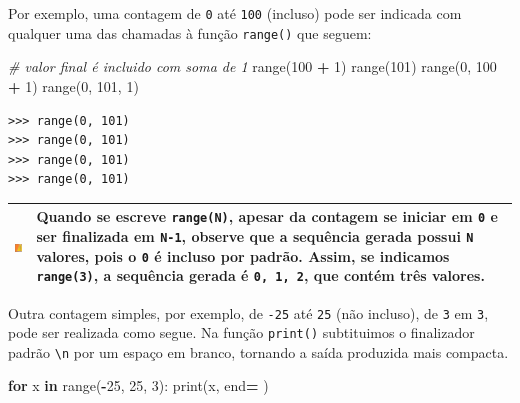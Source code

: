 \documentclass[
]{book}
\newenvironment{Shaded}{\begin{snugshade}}{\end{snugshade}}
\newcommand{\BuiltInTok}[1]{#1}
\newcommand{\CommentTok}[1]{\textcolor[rgb]{0.56,0.35,0.01}{\textit{#1}}}
\newcommand{\ControlFlowTok}[1]{\textcolor[rgb]{0.13,0.29,0.53}{\textbf{#1}}}
\newcommand{\DecValTok}[1]{\textcolor[rgb]{0.00,0.00,0.81}{#1}}
\newcommand{\KeywordTok}[1]{\textcolor[rgb]{0.13,0.29,0.53}{\textbf{#1}}}
\newcommand{\NormalTok}[1]{#1}
\newcommand{\OperatorTok}[1]{\textcolor[rgb]{0.81,0.36,0.00}{\textbf{#1}}}
\newcommand{\StringTok}[1]{\textcolor[rgb]{0.31,0.60,0.02}{#1}}
\begin{document}
Por exemplo, uma contagem de \texttt{0} até \texttt{100} (incluso) pode ser indicada com qualquer uma das chamadas à função \texttt{range()} que seguem:

\begin{Shaded}
\begin{Highlighting}[]
\CommentTok{\# valor final é incluido com soma de 1}
\BuiltInTok{range}\NormalTok{(}\DecValTok{100} \OperatorTok{+} \DecValTok{1}\NormalTok{)}
\BuiltInTok{range}\NormalTok{(}\DecValTok{101}\NormalTok{)}
\BuiltInTok{range}\NormalTok{(}\DecValTok{0}\NormalTok{, }\DecValTok{100} \OperatorTok{+} \DecValTok{1}\NormalTok{)}
\BuiltInTok{range}\NormalTok{(}\DecValTok{0}\NormalTok{, }\DecValTok{101}\NormalTok{, }\DecValTok{1}\NormalTok{)}
\end{Highlighting}
\end{Shaded}

\begin{verbatim}
>>> range(0, 101)
>>> range(0, 101)
>>> range(0, 101)
>>> range(0, 101)
\end{verbatim}

\begin{longtable}[]{@{}
  >{\centering\arraybackslash}p{}
  >{\raggedright\arraybackslash}p{}@{}}
\toprule
\includegraphics{images/warn.png} & Quando se escreve \texttt{range(N)}, apesar da contagem se iniciar em \texttt{0} e ser finalizada em \texttt{N-1}, observe que a sequência gerada possui \texttt{N} valores, pois o \texttt{0} é incluso por padrão. Assim, se indicamos \texttt{range(3)}, a sequência gerada é \texttt{0,\ 1,\ 2}, que contém três valores. \\
\midrule
\endhead
\bottomrule
\end{longtable}

Outra contagem simples, por exemplo, de \texttt{-25} até \texttt{25} (não incluso), de \texttt{3} em \texttt{3}, pode ser realizada como segue. Na função \texttt{print()} subtituimos o finalizador padrão \texttt{\textbackslash{}n} por um espaço em branco, tornando a saída produzida mais compacta.

\begin{Shaded}
\begin{Highlighting}[]
\ControlFlowTok{for}\NormalTok{ x }\KeywordTok{in} \BuiltInTok{range}\NormalTok{(}\OperatorTok{{-}}\DecValTok{25}\NormalTok{, }\DecValTok{25}\NormalTok{, }\DecValTok{3}\NormalTok{):}
    \BuiltInTok{print}\NormalTok{(x, end}\OperatorTok{=}\StringTok{\textquotesingle{} \textquotesingle{}}\NormalTok{)}
\end{Highlighting}
\end{Shaded}
\end{document}
